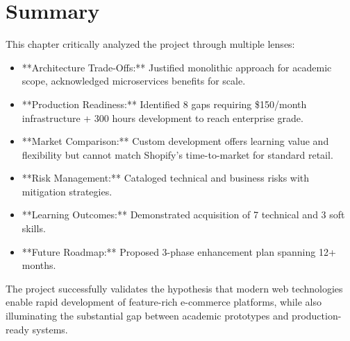 \section{Summary}

This chapter critically analyzed the project through multiple lenses:

\begin{itemize}
    \item **Architecture Trade-Offs:** Justified monolithic approach for academic scope, acknowledged microservices benefits for scale.
    \item **Production Readiness:** Identified 8 gaps requiring \$150/month infrastructure + 300 hours development to reach enterprise grade.
    \item **Market Comparison:** Custom development offers learning value and flexibility but cannot match Shopify's time-to-market for standard retail.
    \item **Risk Management:** Cataloged technical and business risks with mitigation strategies.
    \item **Learning Outcomes:** Demonstrated acquisition of 7 technical and 3 soft skills.
    \item **Future Roadmap:** Proposed 3-phase enhancement plan spanning 12+ months.
\end{itemize}

The project successfully validates the hypothesis that modern web technologies enable rapid development of feature-rich e-commerce platforms, while also illuminating the substantial gap between academic prototypes and production-ready systems.

